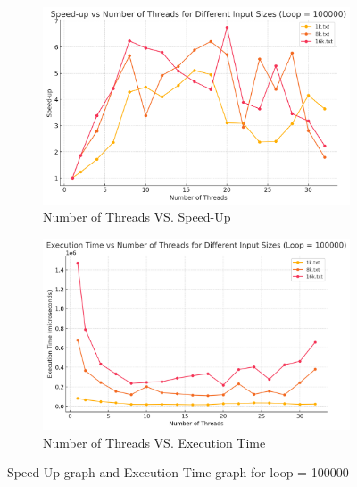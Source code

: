 \documentclass[letterpaper,12pt]{article}
\theoremstyle{remark}
\begin{document}
\hfill  %


\begin{figure}[H]
    \centering
    \begin{subfigure}[t]{0.48\textwidth}  %
        \centering
        \includegraphics[width=\textwidth]{loop100000Sleep.png}
        \caption{Number of Threads VS. Speed-Up}
        \label{fig:ThreadVsSpeedUp1}
    \end{subfigure}
    \hfill  %
    \begin{subfigure}[t]{0.48\textwidth}  %
        \centering
        \includegraphics[width=\textwidth]{loop100000ExecutionTime.png}
        \caption{Number of Threads VS. Execution Time}
        \label{fig:ThreadVsExecutionTime}
    \end{subfigure}
    \caption{Speed-Up graph and Execution Time graph for loop = 100000}
    \label{fig:ThreadVsComparison}
\end{figure}
\end{document}
